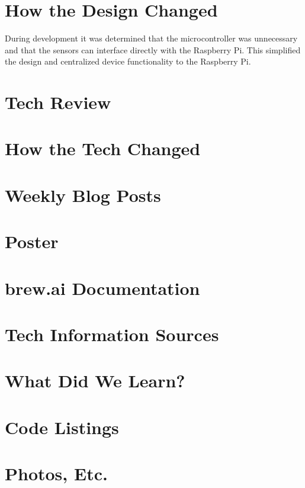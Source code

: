 \documentclass[draftclsnofoot,onecolumn,letterpaper,10pt]{IEEEtran}
\begin{document}
\section{How the Design Changed}

During development it was determined that the microcontroller was unnecessary and that the sensors can interface directly with the Raspberry Pi.
This simplified the design and centralized device functionality to the Raspberry Pi.

\section{Tech Review}


\section{How the Tech Changed}
\section{Weekly Blog Posts}


\section{Poster}
\section{brew.ai Documentation}
\section{Tech Information Sources}
\section{What Did We Learn?}

\appendix
\section{Code Listings}
\section{Photos, Etc.}
\end{document}
